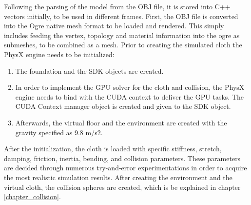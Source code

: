 Following the parsing of the model from the OBJ file, it is stored into C++ vectors initially, to be used in different frames. First, the OBJ file is converted into the Ogre native 
mesh format to be loaded and rendered. This simply includes feeding the vertex, topology and material information into the ogre as submeshes, to be combined as a mesh.
Prior to creating the simulated cloth the PhysX engine needs to be initialized:

\begin{enumerate}
\item The foundation and the SDK objects are created.
\item In order to implement the GPU solver for the cloth and collision, the PhysX engine needs to bind with the CUDA context to deliver the GPU tasks. The CUDA Context manager object is created and given to the SDK object.
\item Afterwards, the virtual floor and the environment are created with the gravity specified as 9.8 m/s2. 
\end{enumerate}

After the initialization, the cloth is loaded with specific stiffness, stretch, damping, friction, inertia, bending, and collision parameters. These parameters are decided through numerous try-and-error experimentations 
in order to acquire the most realistic simulation results.
After creating the environment and the virtual cloth, the collision spheres are created, which is be explained in chapter \ref{chapter_collision}.

